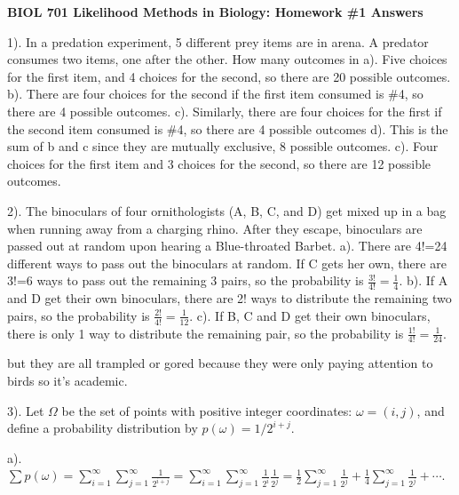 \documentclass[11pt]{article}
\begin{document}
\pagestyle{empty}

\begin{center}
{\bf \large BIOL 701 Likelihood Methods in Biology:  Homework \#1 Answers}
\end{center}
1). In a predation experiment, 5 different prey items are in arena.  A predator consumes two items, one after the other.  How many outcomes in
\newline
a). Five choices for the first item, and 4 choices for the second, so there are 20 possible outcomes.
\newline
b). There are four choices for the second if the first item consumed is \#4, so there are 4 possible outcomes.
\newline
c).  Similarly, there are four choices for the first if the second item consumed is \#4, so there are 4 possible outcomes
\newline
d). This is the sum of b and c since they are mutually exclusive, 8 possible outcomes.
\newline
c). Four choices for the first item and 3 choices for the second, so there are 12 possible outcomes.
\vspace*{.1in}

2).  The binoculars of four ornithologists (A, B, C, and D) get mixed up in a bag when running away from a charging rhino.  After they escape, binoculars are passed out at random upon hearing a Blue-throated Barbet.  
\newline
a).  There are 4!=24 different ways to pass out the binoculars at random.  If C gets her own, there are 3!=6 ways to pass out the remaining 3 pairs, so the probability is $\frac{3!}{4!}=\frac{1}{4}$.
\newline
b).  If A and D get their own binoculars, there are 2! ways to distribute the remaining two pairs, so the probability is $\frac{2!}{4!}=\frac{1}{12}$.
\newline
c).  If B, C and D get their own binoculars, there is only 1 way to distribute the remaining pair, so the probability is $\frac{1!}{4!}=\frac{1}{24}$.


but they are all trampled or gored because they were only paying attention to birds so it's academic.
\vspace*{.1in}

3).  Let $\Omega$ be the set of points with positive integer coordinates:  $\omega=(i,j)$, and define a probability distribution by $p(\omega)=1/2^{i+j}$.

a).  $\sum p(\omega)=\sum_{i=1}^\infty \sum_{j=1}^\infty \frac{1}{2^{i+j}}=\sum_{i=1}^\infty \sum_{j=1}^\infty \frac{1}{2^{i}}\frac{1}{2^{j}}=\frac{1}{2}\sum_{j=1}^\infty \frac{1}{2^{j}}+\frac{1}{4}\sum_{j=1}^\infty \frac{1}{2^{j}}+\cdots$.
\end{document}
